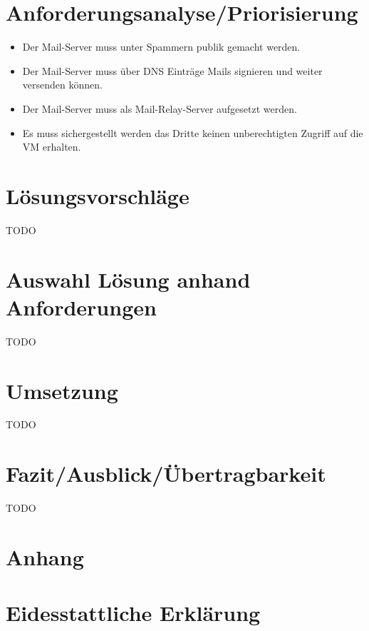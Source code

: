 \documentclass[a4paper,11pt,singlespacing]{article}
\begin{document}
\section{Anforderungsanalyse/Priorisierung}\label{sec:AnforderungsanalysePriorisierung}
	\begin{itemize}
	\item Der Mail-Server muss unter Spammern publik gemacht werden.
	\item Der Mail-Server muss über DNS Einträge Mails signieren und weiter versenden können.
	\item Der Mail-Server muss als Mail-Relay-Server aufgesetzt werden.
	\item Es muss sichergestellt werden das Dritte keinen unberechtigten Zugriff auf die VM erhalten.
	\end{itemize}


\section{Lösungsvorschläge}\label{sec:Lösungsvorschläge}
	TODO


\section{Auswahl Lösung anhand Anforderungen}\label{sec:AuswahlLösungAnhandAnforderungen}
	TODO


\section{Umsetzung}\label{sec:Umsetzung}
	TODO


\section{Fazit/Ausblick/Übertragbarkeit}\label{sec:Fazit/Ausblick/Übertragbarkeit}
	TODO


\newpage




\listoffigures
{}

\lstlistoflistings
{}

\newpage

\section*{Anhang}\label{Anhang}

\newpage

\section*{Eidesstattliche Erklärung}\label{sec:Eidesstattliche Erklärung}
\end{document}
